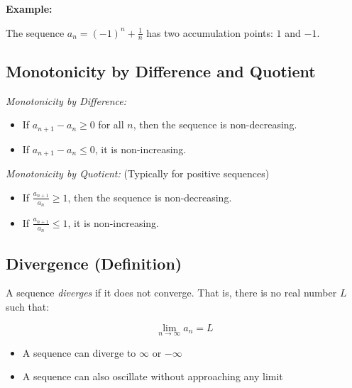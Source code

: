 \textbf{Example:}
\vspace{\baselineskip}
 
The sequence \(a_n = {(-1)}^n + \frac{1}{n}\) has two accumulation points: \(1\) and \(-1\).

\subsection{Monotonicity by Difference and Quotient}

\emph{Monotonicity by Difference:}

\begin{itemize}

    \item If \(a_{n+1} - a_n \ge 0\) for all \(n\), then the sequence is non-decreasing.


    \item If \(a_{n+1} - a_n \le 0\), it is non-increasing.

\end{itemize}

\emph{Monotonicity by Quotient:} (Typically for positive sequences)

\begin{itemize}

    \item If \(\frac{a_{n+1}}{a_n} \ge 1\), then the sequence is non-decreasing.


    \item If \(\frac{a_{n+1}}{a_n} \le 1\), it is non-increasing.

\end{itemize}

\subsection{Divergence (Definition)}

A sequence \emph{diverges} if it does not converge. That is, there is no real number \(L\) such that:

\[
    \lim_{n \to \infty} a_n = L
\]

\begin{itemize}

    \item A sequence can diverge to \(\infty\) or \(-\infty\)

    \item A sequence can also oscillate without approaching any limit

\end{itemize}

